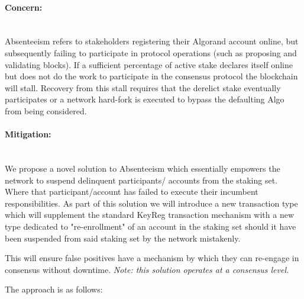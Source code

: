 \documentclass[11pt,a4paper]{article}
\begin{document}
\paragraph{Concern:} \mbox{}\\
Absenteeism refers to stakeholders registering their Algorand account online, but subsequently failing to participate in 
protocol operations (such as proposing and validating blocks). If a sufficient percentage of active stake declares 
itself online but does not do the work to participate in the consensus protocol the blockchain will stall. Recovery from 
this stall requires that the derelict stake eventually participates or a network hard-fork is executed to bypass the 
defaulting Algo from being considered. 

\paragraph{Mitigation:} \mbox{}\\
We propose a novel solution to Absenteeism which essentially empowers the network to suspend delinquent participants/
accounts from the staking set. Where that participant/account has failed to execute their incumbent responsibilities.
As part of this solution we will introduce a new transaction type which will supplement the standard \gls{KeyReg} 
transaction mechanism with a new type dedicated to "re-enrollment" of an account in the staking set should it have been 
suspended from said staking set by the network mistakenly.

This will ensure false positives have a mechanism by which they can re-engage in consensus without downtime.
\emph{Note: this solution operates at a consensus level.}

The approach is as follows:
\end{document}
